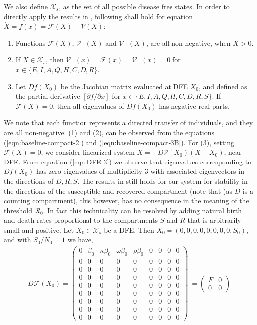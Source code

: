 \documentclass[10pt]{wlscirep}
\begin{document}
%
%
We also define $\mathcal{X}_s$, as the set of all possible disease free states. In order to directly apply the results in \cite{VANDENDRIESSCHE200229}, following shall hold for equation $\dot{X} = f(x) = \mathcal{F}(X) - \mathcal{V}(X)$:
\begin{enumerate}
	\item Functions $\mathcal{F}(X)$, $\mathcal{V}^{-}(X)$ and $\mathcal{V}^{+}(X)$, are all non-negative, when $X > 0$.
	\item If $X \in \mathcal{X}_s$, then $\mathcal{V}^{-}(x)=\mathcal{F}(x)=\mathcal{V}^{+}(x)=0$ for $x \in \{E, I, A, Q, H, C, D, R\}$.
	\item Let $Df(X_0)$ be the Jacobian matrix evaluated at DFE $X_0$, and defined as the partial derivative $[{\partial f}/{\partial x}]$ for $x \in \{E, I, A, Q, H, C, D, R, S\}$. If $\mathcal{F}(X) = 0$, then all eigenvalues of $Df(X_0)$ has negative real parts.
\end{enumerate}
We note that each function represents a directed transfer of individuals, and they are all non-negative. (1) and (2), can be observed from the equations (\ref{eqn:baseline-compact-2}) and (\ref{eqn:baseline-compact-3B}).  For (3), setting $\mathcal{F}(X) = 0$, we consider linearized system $\dot{X} = - D\mathcal{V}(X_0)(X-X_0)$, near DFE. From equation (\ref{eqn:DFE-3}) we observe that eigenvalues corresponding to $Df(X_0)$ has zero eigenvalues of multiplicity $3$ with associated eigenvectors in the directions of $D, R, S$. The results in \cite{VANDENDRIESSCHE200229} still holds for our system for stability in the directions of the susceptible and recovered compartment (note that )as $D$ is a counting compartment), this however, has no consequence in the meaning of the threshold $\mathcal{R}_0$. In fact this technicality can be resolved by adding natural birth and death rates proportional to the compartments $S$ and $R$ that is arbitrarily small and positive. 
%
%
Let $X_0 \in \mathcal{X}_s$ be a DFE. Then $X_0 = \left( 0, 0, 0, 0, 0, 0, 0, 0, S_0 \right) $, and with $S_0/N_0=1$ we have, 
%
%
\begin{equation}
\begin{split}
D \mathcal{F}(X_0) =  \begin{pmatrix}
0 & \beta_0 & \kappa \beta_0 & \omega \beta_0 & \rho \beta_0 & 0 & 0 & 0 & 0 \\
0 & 0 & 0 & 0 & 0 & 0 &0 & 0 &0 \\
0 & 0 & 0 & 0 & 0 & 0 &0 & 0 &0 \\
0 & 0 & 0 & 0 & 0 & 0 &0 & 0 &0 \\
0 & 0 & 0 & 0 & 0 & 0 &0 & 0 &0 \\
0 & 0 & 0 & 0 & 0 & 0 &0 & 0 &0 \\
0 & 0 & 0 & 0 & 0 & 0 &0 & 0 &0 \\
0 & 0 & 0 & 0 & 0 & 0 &0 & 0 &0 \\
0 & 0 & 0 & 0 & 0 & 0 &0 & 0 &0
 \end{pmatrix}\ =  \begin{pmatrix}
 F & 0\\
 0 & 0
  \end{pmatrix}
\end{split}
\nonumber
\label{eqn:DFE-1}
\end{equation}
\end{document}
